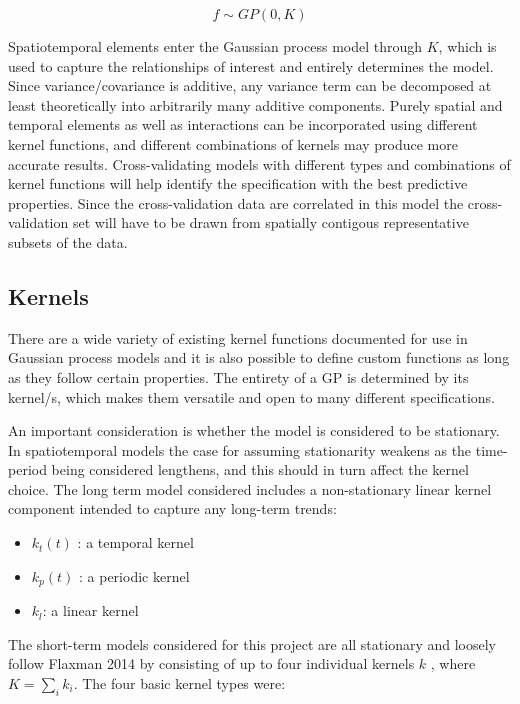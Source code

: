 $$ f \sim GP(0,K) $$

Spatiotemporal elements enter the Gaussian process model through $K$, which is used to capture the relationships of interest and entirely determines the model. Since variance/covariance is additive, any variance term can be decomposed at least theoretically into arbitrarily many additive components. Purely spatial and temporal elements as well as interactions can be incorporated using different kernel functions, and different combinations of kernels may produce more accurate results. Cross-validating models with different types and combinations of kernel functions will help identify the specification with the best predictive properties. Since the cross-validation data are correlated in this model the cross-validation set will have to be drawn from spatially contigous representative subsets of the data.

\subsection{Kernels}

There are a wide variety of existing kernel functions documented for use in Gaussian process models \cite{rasmussen_2005} and it is also possible to define custom functions as long as they follow certain properties. The entirety of a GP is determined by its kernel/s, which makes them versatile and open to many different specifications. \par

An important consideration is whether the model is considered to be stationary. In spatiotemporal models the case for assuming stationarity weakens as the time-period being considered lengthens, and this should in turn affect the kernel choice. The long term model considered includes a non-stationary linear kernel component intended to capture any long-term trends:    \par

\begin{itemize}
  \item $k_t(t)$ : a temporal kernel
  \item $k_p(t)$ : a periodic kernel
  \item $k_l$: a linear kernel
\end{itemize}

The short-term models considered for this project are all stationary and loosely follow Flaxman 2014 by consisting of up to four individual kernels $k$ , where $K=\sum_{i}k_i$. The four basic kernel types were:

